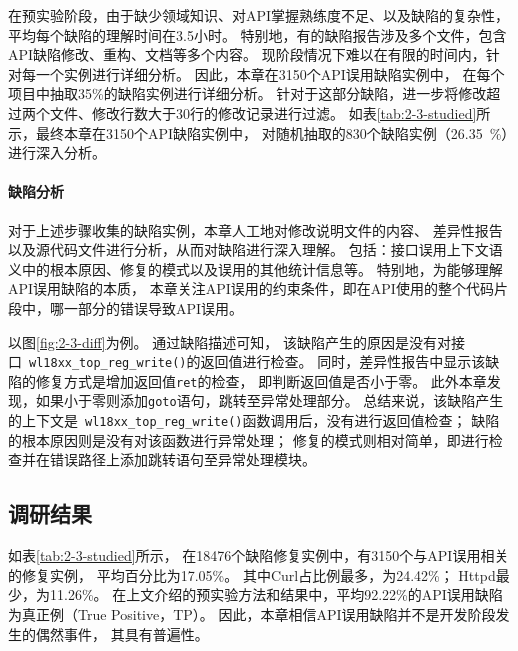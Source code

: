 在预实验阶段，由于缺少领域知识、对API掌握熟练度不足、以及缺陷的复杂性，
平均每个缺陷的理解时间在3.5小时。
特别地，有的缺陷报告涉及多个文件，包含API缺陷修改、重构、文档等多个内容。
现阶段情况下难以在有限的时间内，针对每一个实例进行详细分析。
因此，本章在3150个API误用缺陷实例中，
在每个项目中抽取35\%的缺陷实例进行详细分析。
针对于这部分缺陷，进一步将修改超过两个文件、修改行数大于30行的修改记录进行过滤。
如表\ref{tab:2-3-studied}所示，最终本章在3150个API缺陷实例中，
对随机抽取的830个缺陷实例（26.35~\%）进行深入分析。


\paragraph{缺陷分析}
对于上述步骤收集的缺陷实例，本章人工地对修改说明文件的内容、
差异性报告以及源代码文件进行分析，从而对缺陷进行深入理解。
包括：接口误用上下文语义中的根本原因、修复的模式以及误用的其他统计信息等。
特别地，为能够理解API误用缺陷的本质，
本章关注API误用的约束条件，即在API使用的整个代码片段中，哪一部分的错误导致API误用。

以图\ref{fig:2-3-diff}为例。
通过缺陷描述可知，
该缺陷产生的原因是没有对接口~\texttt{wl18xx\_top\_reg\_write()}的返回值进行检查。
同时，差异性报告中显示该缺陷的修复方式是增加返回值\texttt{ret}的检查，
即判断返回值是否小于零。
此外本章发现，如果小于零则添加\texttt{goto}语句，跳转至异常处理部分。
总结来说，该缺陷产生的上下文是~\texttt{wl18xx\_top\_reg\_write()}函数调用后，没有进行返回值检查；
缺陷的根本原因则是没有对该函数进行异常处理；
修复的模式则相对简单，即进行检查并在错误路径上添加跳转语句至异常处理模块。


\subsection{调研结果}
如表\ref{tab:2-3-studied}所示，
在18476个缺陷修复实例中，有3150个与API误用相关的修复实例，
平均百分比为17.05\%。
其中Curl占比例最多，为24.42\%；
Httpd最少，为11.26\%。
在上文介绍的预实验方法和结果中，平均92.22\%的API误用缺陷为真正例（True Positive，TP）。
因此，本章相信API误用缺陷并不是开发阶段发生的偶然事件，
其具有普遍性。

\vspace*{10pt}
\begin{center}
\noindent{}
\end{center}

